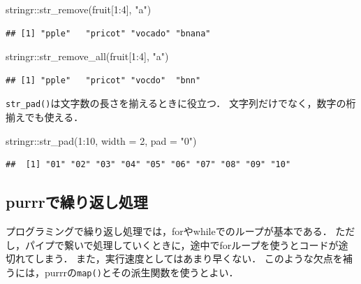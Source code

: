 \documentclass[
]{article}
\newenvironment{Shaded}{\begin{snugshade}}{\end{snugshade}}
\newcommand{\AttributeTok}[1]{\textcolor[rgb]{0.77,0.63,0.00}{#1}}
\newcommand{\DecValTok}[1]{\textcolor[rgb]{0.00,0.00,0.81}{#1}}
\newcommand{\FunctionTok}[1]{\textcolor[rgb]{0.00,0.00,0.00}{#1}}
\newcommand{\NormalTok}[1]{#1}
\newcommand{\SpecialCharTok}[1]{\textcolor[rgb]{0.00,0.00,0.00}{#1}}
\newcommand{\StringTok}[1]{\textcolor[rgb]{0.31,0.60,0.02}{#1}}
\begin{document}
\begin{Shaded}
\begin{Highlighting}[]
\NormalTok{stringr}\SpecialCharTok{::}\FunctionTok{str\_remove}\NormalTok{(fruit[}\DecValTok{1}\SpecialCharTok{:}\DecValTok{4}\NormalTok{], }\StringTok{"a"}\NormalTok{)}
\end{Highlighting}
\end{Shaded}

\begin{verbatim}
## [1] "pple"   "pricot" "vocado" "bnana"
\end{verbatim}

\begin{Shaded}
\begin{Highlighting}[]
\NormalTok{stringr}\SpecialCharTok{::}\FunctionTok{str\_remove\_all}\NormalTok{(fruit[}\DecValTok{1}\SpecialCharTok{:}\DecValTok{4}\NormalTok{], }\StringTok{"a"}\NormalTok{)}
\end{Highlighting}
\end{Shaded}

\begin{verbatim}
## [1] "pple"   "pricot" "vocdo"  "bnn"
\end{verbatim}

\texttt{str\_pad()}は文字数の長さを揃えるときに役立つ．
文字列だけでなく，数字の桁揃えでも使える．

\begin{Shaded}
\begin{Highlighting}[]
\NormalTok{stringr}\SpecialCharTok{::}\FunctionTok{str\_pad}\NormalTok{(}\DecValTok{1}\SpecialCharTok{:}\DecValTok{10}\NormalTok{, }\AttributeTok{width =} \DecValTok{2}\NormalTok{, }\AttributeTok{pad =} \StringTok{"0"}\NormalTok{)}
\end{Highlighting}
\end{Shaded}

\begin{verbatim}
##  [1] "01" "02" "03" "04" "05" "06" "07" "08" "09" "10"
\end{verbatim}

\hypertarget{purrr}{%
\subsection{purrrで繰り返し処理}\label{purrr}}

プログラミングで繰り返し処理では，forやwhileでのループが基本である．
ただし，パイプで繋いで処理していくときに，途中でforループを使うとコードが途切れてしまう．
また，実行速度としてはあまり早くない．
このような欠点を補うには，purrrの\texttt{map()}とその派生関数を使うとよい．
\end{document}
